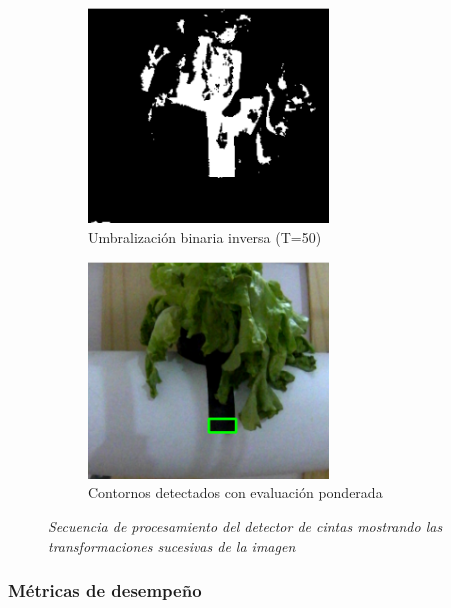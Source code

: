 \begin{figure}[H]
\begin{subfigure}[b]{0.48\textwidth}
    \centering
    \includegraphics[width=0.7\textwidth]{imagenes/detector_marcadores_3_binario.png}
    \caption{Umbralización binaria inversa (T=50)}
\end{subfigure}
\hfill
\begin{subfigure}[b]{0.48\textwidth}
    \centering
    \includegraphics[width=0.7\textwidth]{imagenes/detector_marcadores_4_contornos.png}
    \caption{Contornos detectados con evaluación ponderada}
\end{subfigure}

\caption{\textit{Secuencia de procesamiento del detector de cintas mostrando las transformaciones sucesivas de la imagen}}
\label{fig:proceso_marcadores}
\end{figure}

\subsubsection{Métricas de desempeño}

